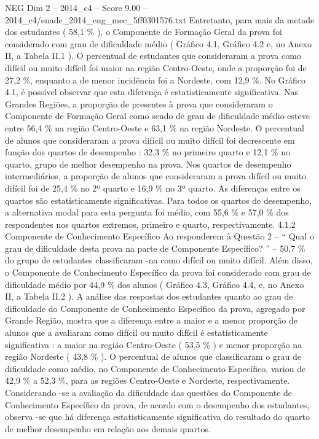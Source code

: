 \begin{textsample}{NEG Dim 2 – 2014\_c4 – Score 9.00 – 2014\_c4/enade\_2014\_eng\_mec\_5ff0301576.txt}
Entretanto, para mais da metade dos estudantes ( 58,1 \% ), o Componente de Formação Geral da prova foi considerado com grau de dificuldade médio ( Gráfico 4.1, Gráfico 4.2 e, no Anexo II, a Tabela II.1 ).
O percentual de estudantes que consideraram a prova como difícil ou muito difícil foi maior na região Centro-Oeste, onde a proporção foi de 27,2 \%, enquanto a de menor incidência foi a Nordeste, com 12,9 \%.
No Gráfico 4.1, é possível observar que esta diferença é estatisticamente significativa.
Nas Grandes Regiões, a proporção de presentes à prova que consideraram o Componente de Formação Geral como sendo de grau de dificuldade médio esteve entre 56,4 \% na região Centro-Oeste e 63,1 \% na região Nordeste.
O percentual de alunos que consideraram a prova difícil ou muito difícil foi decrescente em função dos quartos de desempenho : 32,3 \% no primeiro quarto e 12,1 \% no quarto, grupo de melhor desempenho na prova.
Nos quartos de desempenho intermediários, a proporção de alunos que consideraram a prova difícil ou muito difícil foi de 25,4 \% no 2º quarto e 16,9 \% no 3º quarto.
As diferenças entre os quartos são estatisticamente significativas.
Para todos os quartos de desempenho, a alternativa modal para esta pergunta foi médio, com 55,6 \% e 57,0 \% dos respondentes nos quartos extremos, primeiro e quarto, respectivamente. 4.1.2 Componente de Conhecimento Específico Ao responderem à Questão 2 – “ Qual o grau de dificuldade desta prova na parte de Componente Específico? ” – 50,7 \% do grupo de estudantes classificaram -na como difícil ou muito difícil.
Além disso, o Componente de Conhecimento Específico da prova foi considerado com grau de dificuldade médio por 44,9 \% dos alunos ( Gráfico 4.3, Gráfico 4.4, e, no Anexo II, a Tabela II.2 ).
A análise das respostas dos estudantes quanto ao grau de dificuldade do Componente de Conhecimento Específico da prova, agregado por Grande Região, mostra que a diferença entre a maior e a menor proporção de alunos que a avaliaram como difícil ou muito difícil é estatisticamente significativa : a maior na região Centro-Oeste ( 53,5 \% ) e menor proporção na região Nordeste ( 43,8 \% ).
O percentual de alunos que classificaram o grau de dificuldade como médio, no Componente de Conhecimento Específico, variou de 42,9 \% a 52,3 \%, para as regiões Centro-Oeste e Nordeste, respectivamente.
Considerando -se a avaliação da dificuldade das questões do Componente de Conhecimento Específico da prova, de acordo com o desempenho dos estudantes, observa -se que há diferença estatisticamente significativa do resultado do quarto de melhor desempenho em relação aos demais quartos.

\end{textsample}
